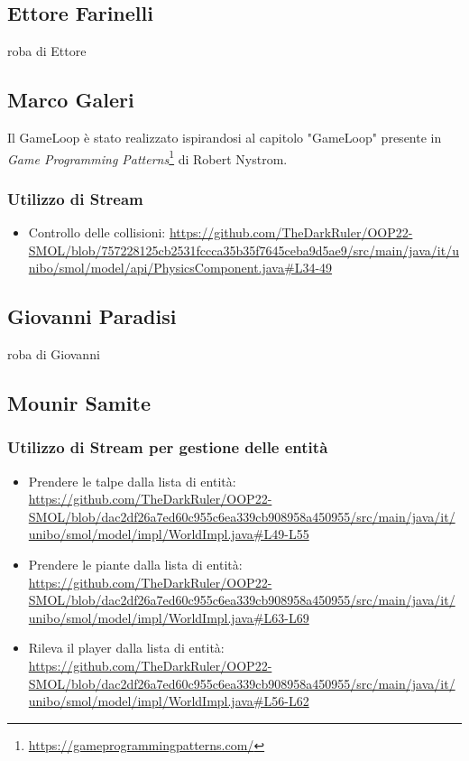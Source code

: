 \documentclass[a4paper,12pt]{report}
\begin{document}
\subsection*{Ettore Farinelli}
roba di Ettore
\subsection*{Marco Galeri}

Il GameLoop è stato realizzato ispirandosi al capitolo "GameLoop" presente in \emph{Game Programming Patterns}\footnote{\url{https://gameprogrammingpatterns.com/}} di Robert Nystrom.

\subsubsection{Utilizzo di Stream}
\begin{itemize}
    \item Controllo delle collisioni: \url{https://github.com/TheDarkRuler/OOP22-SMOL/blob/757228125cb2531fccca35b35f7645ceba9d5ae9/src/main/java/it/unibo/smol/model/api/PhysicsComponent.java#L34-49}

\end{itemize}

\subsection*{Giovanni Paradisi}
roba di Giovanni
\subsection*{Mounir Samite}
\subsubsection*{Utilizzo di Stream per gestione delle entità}
\begin{itemize}
    \item Prendere le talpe dalla lista di entità: \url{https://github.com/TheDarkRuler/OOP22-SMOL/blob/dac2df26a7ed60c955c6ea339cb908958a450955/src/main/java/it/unibo/smol/model/impl/WorldImpl.java#L49-L55}
    \item Prendere le piante dalla lista di entità: \url{https://github.com/TheDarkRuler/OOP22-SMOL/blob/dac2df26a7ed60c955c6ea339cb908958a450955/src/main/java/it/unibo/smol/model/impl/WorldImpl.java#L63-L69}
    \item Rileva il player dalla lista di entità: \url{https://github.com/TheDarkRuler/OOP22-SMOL/blob/dac2df26a7ed60c955c6ea339cb908958a450955/src/main/java/it/unibo/smol/model/impl/WorldImpl.java#L56-L62}
\end{itemize}
\end{document}

